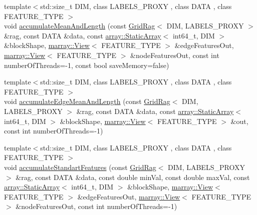 \begin{DoxyCompactItemize}
\item 
{\footnotesize template$<$std\+::size\+\_\+t D\+IM, class L\+A\+B\+E\+L\+S\+\_\+\+P\+R\+O\+XY , class D\+A\+TA , class F\+E\+A\+T\+U\+R\+E\+\_\+\+T\+Y\+PE $>$ }\\void \hyperlink{namespacenifty_1_1graph_afa27dafc0727ab9fb2d7e5e5fa23996b}{accumulate\+Mean\+And\+Length} (const \hyperlink{classnifty_1_1graph_1_1GridRag}{Grid\+Rag}$<$ D\+IM, L\+A\+B\+E\+L\+S\+\_\+\+P\+R\+O\+XY $>$ \&rag, const D\+A\+TA \&data, const \hyperlink{namespacenifty_1_1array_a683f151f19c851754e0c6d55ed16a0c2}{array\+::\+Static\+Array}$<$ int64\+\_\+t, D\+IM $>$ \&block\+Shape, \hyperlink{classandres_1_1View}{marray\+::\+View}$<$ F\+E\+A\+T\+U\+R\+E\+\_\+\+T\+Y\+PE $>$ \&edge\+Features\+Out, \hyperlink{classandres_1_1View}{marray\+::\+View}$<$ F\+E\+A\+T\+U\+R\+E\+\_\+\+T\+Y\+PE $>$ \&node\+Features\+Out, const int number\+Of\+Threads=-\/1, const bool save\+Memory=false)
\item 
{\footnotesize template$<$std\+::size\+\_\+t D\+IM, class L\+A\+B\+E\+L\+S\+\_\+\+P\+R\+O\+XY , class D\+A\+TA , class F\+E\+A\+T\+U\+R\+E\+\_\+\+T\+Y\+PE $>$ }\\void \hyperlink{namespacenifty_1_1graph_a44f9d32c6516b8a8fad328a7bffff8fe}{accumulate\+Edge\+Mean\+And\+Length} (const \hyperlink{classnifty_1_1graph_1_1GridRag}{Grid\+Rag}$<$ D\+IM, L\+A\+B\+E\+L\+S\+\_\+\+P\+R\+O\+XY $>$ \&rag, const D\+A\+TA \&data, const \hyperlink{namespacenifty_1_1array_a683f151f19c851754e0c6d55ed16a0c2}{array\+::\+Static\+Array}$<$ int64\+\_\+t, D\+IM $>$ \&block\+Shape, \hyperlink{classandres_1_1View}{marray\+::\+View}$<$ F\+E\+A\+T\+U\+R\+E\+\_\+\+T\+Y\+PE $>$ \&out, const int number\+Of\+Threads=-\/1)
\item 
{\footnotesize template$<$std\+::size\+\_\+t D\+IM, class L\+A\+B\+E\+L\+S\+\_\+\+P\+R\+O\+XY , class D\+A\+TA , class F\+E\+A\+T\+U\+R\+E\+\_\+\+T\+Y\+PE $>$ }\\void \hyperlink{namespacenifty_1_1graph_a42c0895aee417f8a18d643aad2591c8b}{accumulate\+Standart\+Features} (const \hyperlink{classnifty_1_1graph_1_1GridRag}{Grid\+Rag}$<$ D\+IM, L\+A\+B\+E\+L\+S\+\_\+\+P\+R\+O\+XY $>$ \&rag, const D\+A\+TA \&data, const double min\+Val, const double max\+Val, const \hyperlink{namespacenifty_1_1array_a683f151f19c851754e0c6d55ed16a0c2}{array\+::\+Static\+Array}$<$ int64\+\_\+t, D\+IM $>$ \&block\+Shape, \hyperlink{classandres_1_1View}{marray\+::\+View}$<$ F\+E\+A\+T\+U\+R\+E\+\_\+\+T\+Y\+PE $>$ \&edge\+Features\+Out, \hyperlink{classandres_1_1View}{marray\+::\+View}$<$ F\+E\+A\+T\+U\+R\+E\+\_\+\+T\+Y\+PE $>$ \&node\+Features\+Out, const int number\+Of\+Threads=-\/1)

\end{DoxyCompactItemize}
